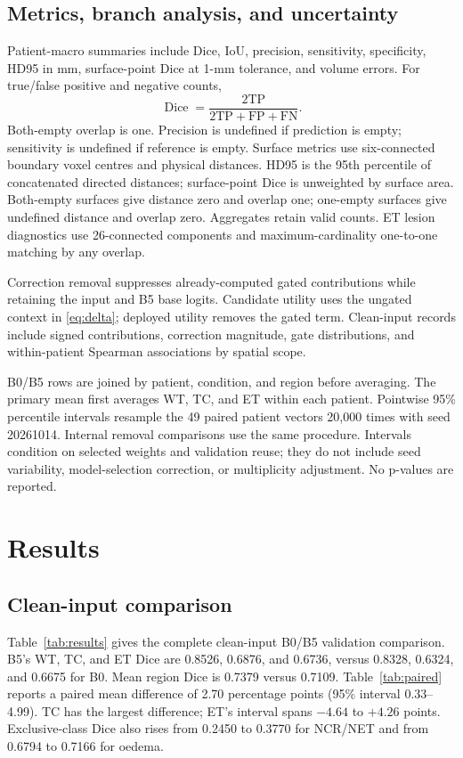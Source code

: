 \documentclass[conference]{IEEEtran}
\begin{document}
\subsection{Metrics, branch analysis, and uncertainty}
Patient-macro summaries include Dice, IoU, precision, sensitivity, specificity, HD95 in mm, surface-point Dice at 1-mm tolerance, and volume errors. For true/false positive and negative counts,
\begin{equation}
\operatorname{Dice}=\frac{2\mathrm{TP}}{2\mathrm{TP}+\mathrm{FP}+\mathrm{FN}}.
\end{equation}
Both-empty overlap is one. Precision is undefined if prediction is empty; sensitivity is undefined if reference is empty. Surface metrics use six-connected boundary voxel centres and physical distances. HD95 is the 95th percentile of concatenated directed distances; surface-point Dice is unweighted by surface area. Both-empty surfaces give distance zero and overlap one; one-empty surfaces give undefined distance and overlap zero. Aggregates retain valid counts. ET lesion diagnostics use 26-connected components and maximum-cardinality one-to-one matching by any overlap.

Correction removal suppresses already-computed gated contributions while retaining the input and B5 base logits. Candidate utility uses the ungated context in \eqref{eq:delta}; deployed utility removes the gated term. Clean-input records include signed contributions, correction magnitude, gate distributions, and within-patient Spearman associations by spatial scope.

B0/B5 rows are joined by patient, condition, and region before averaging. The primary mean first averages WT, TC, and ET within each patient. Pointwise 95\% percentile intervals resample the 49 paired patient vectors 20,000 times with seed 20261014. Internal removal comparisons use the same procedure. Intervals condition on selected weights and validation reuse; they do not include seed variability, model-selection correction, or multiplicity adjustment. No p-values are reported.

\section{Results}
\subsection{Clean-input comparison}
Table~\ref{tab:results} gives the complete clean-input B0/B5 validation comparison. B5's WT, TC, and ET Dice are 0.8526, 0.6876, and 0.6736, versus 0.8328, 0.6324, and 0.6675 for B0. Mean region Dice is 0.7379 versus 0.7109. Table~\ref{tab:paired} reports a paired mean difference of 2.70 percentage points (95\% interval 0.33--4.99). TC has the largest difference; ET's interval spans $-4.64$ to $+4.26$ points. Exclusive-class Dice also rises from 0.2450 to 0.3770 for NCR/NET and from 0.6794 to 0.7166 for oedema.
\end{document}
